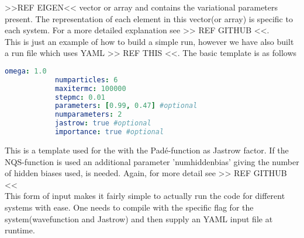      >>REF EIGEN<< vector or array and contains the variational
    parameters present. The representation of each element in this vector(or
    array) is specific to each system. For a more detailed explanation see >>
    REF GITHUB <<. \\
    This is just an example of how to build a simple run, however we have also
    built a run file which uses YAML >> REF THIS <<. The basic template is as
    follows
        \begin{lstlisting}[language=yaml]
            omega: 1.0
            numparticles: 6
            maxitermc: 100000
            stepmc: 0.01
            parameters: [0.99, 0.47] #optional
            numparameters: 2
            jastrow: true #optional
            importance: true #optional
        \end{lstlisting}
    This is a template used for the  with the
    Pad\'e-function as Jastrow factor. If the NQS-function is used an
    additional parameter 'numhiddenbias' giving the number of hidden biases
    used, is needed. Again, for more detail see >> REF GITHUB << \\ 
    This form of input makes it fairly simple to actually run the code for
    different systems with ease. One needs to compile with the specific flag
    for the system(wavefunction and Jastrow) and then supply an YAML input file
    at runtime.

